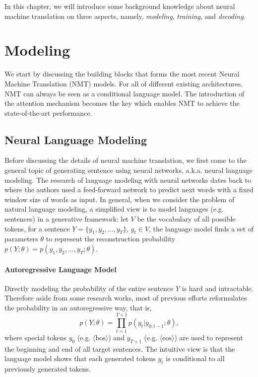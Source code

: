 In this chapter, we will introduce some background knowledge about neural machine translation on three aspects,
namely, \textit{modeling}, \textit{training}, and \textit{decoding}.

\section{Modeling}
We start by discussing the building blocks that forms the most recent Neural Machine Translation (NMT) models. 
For all of different existing architectures, NMT can always be seen as a conditional language model. 
The introduction of the attention mechanism becomes the key which enables NMT to achieve the state-of-the-art performance.

\subsection{Neural Language Modeling}
Before discussing the details of neural machine translation, we first come to the general topic of generating sentence using neural networks, a.k.a. neural language modeling. The research of language modeling with neural networks dates back to \citep[NNLM, ][]{bengio2003neural}  where the authors used a feed-forward network to predict next words with a fixed window size of words as input. In general, when we consider the problem of natural language modeling, a simplified view is to model languages (e.g. sentences) in a generative framework: let $V$ be the vocabulary of all possible tokens, for a sentence $Y=\{y_1, y_2, ..., y_T\}$, $y_t \in V$, the language model finds a set of parameters $\theta$ to represent the reconstruction probability
$p(Y;\theta)=p(y_1, y_2, ..., y_T; \theta)$.
\paragraph{Autoregressive Language Model} Directly modeling the probability of the entire sentence $Y$ is hard and intractable. Therefore aside from some research works, most of previous efforts reformulates the probability in an autoregressive way, that is,
\begin{equation}
\label{cp2.eq.autolm}
    p(Y;\theta) = \prod_{t=1}^{T+1}p(y_t|y_{0:t-1}; \theta),
\end{equation}
where special tokens $y_0$ (e.g. $\langle \mathrm{bos}\rangle$) and $y_{T+1}$ (e.g. $\langle \mathrm{eos}\rangle$) are used to represent the beginning and end of all target sentences. The intuitive view is that the language model shows that each generated tokens $y_t$ is conditional to all previously generated tokens.

